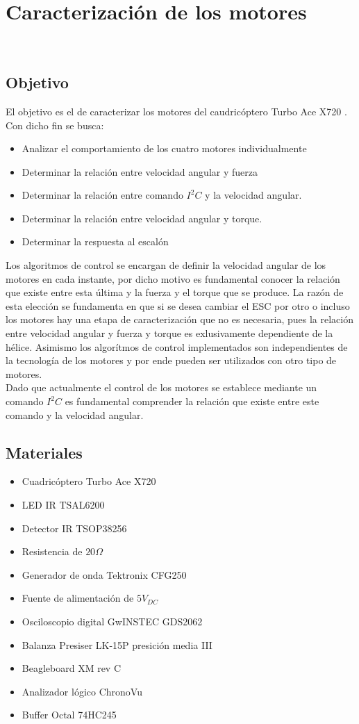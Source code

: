 \documentclass[main]{subfiles}
\begin{document}
\chapter{Caracterizaci\'on de los motores}\
\label{chap:motores}
\section{Objetivo}
El objetivo es el de caracterizar los motores del caudric\'optero Turbo Ace X720 . Con dicho fin se busca:

\begin{itemize}
\item Analizar el comportamiento de los cuatro motores individualmente
\item Determinar la relaci\'on entre velocidad angular y fuerza
\item Determinar la relaci\'on entre comando $I^2C$ y la velocidad angular.
\item Determinar la relaci\'on entre velocidad angular y torque.
\item Determinar la respuesta al escal\'on
\end{itemize}

Los algoritmos de control se encargan de definir la velocidad angular de los motores en cada instante, por dicho motivo es fundamental conocer la relaci\'on que existe entre esta \'ultima y la fuerza y el torque que se produce. La raz\'on de esta elecci\'on se fundamenta en que si se desea cambiar el ESC por otro o incluso los motores hay una etapa de caracterizaci\'on que no es necesaria, pues la relaci\'on entre velocidad angular y fuerza y torque es exlusivamente dependiente de la h\'elice. Asimismo los algor\'itmos de control implementados son independientes de la tecnolog\'ia de los motores y por ende pueden ser utilizados con otro tipo de motores.\\

Dado que actualmente el control de los motores se establece mediante un comando $I^2C$ es fundamental comprender la relaci\'on que existe entre este comando y la velocidad angular.

\section{Materiales}
\begin{itemize}
\item Cuadric\'optero Turbo Ace X720	
\item LED IR TSAL6200
\item Detector IR TSOP38256
\item Resistencia de $20 \Omega$
\item Generador de onda Tektronix CFG250
\item Fuente de alimentaci\'on de $5V_{DC}$
\item Osciloscopio digital GwINSTEC GDS2062
\item Balanza Presiser LK-15P presici\'on media III
\item Beagleboard XM rev C
\item Analizador l\'ogico ChronoVu
\item Buffer Octal 74HC245
\end{itemize}
\end{document}
